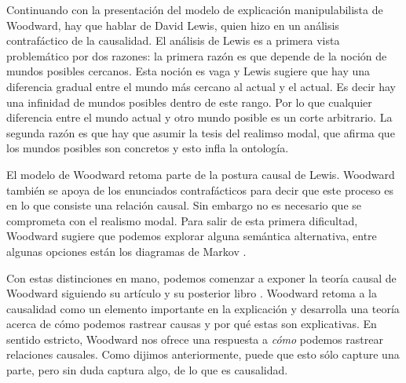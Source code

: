 
Continuando con la presentación del modelo de explicación manipulabilista de Woodward, hay que hablar de David Lewis, quien hizo en  \citeyear{Lewis1973a} un análisis contrafáctico de la causalidad. El análisis de Lewis es a primera vista problemático por dos razones: la primera razón es que depende de la noción de mundos posibles cercanos. Esta noción es vaga y Lewis sugiere que hay una diferencia gradual entre el mundo más cercano al actual y el actual. Es decir hay una infinidad de mundos posibles dentro de este rango. Por lo que cualquier diferencia entre el mundo actual y otro mundo posible es un corte arbitrario. La segunda razón es que hay que asumir la tesis del realimso modal, que afirma que los mundos posibles son concretos y esto infla la ontología.

El modelo de Woodward retoma parte de la postura causal de Lewis. Woodward también se apoya de los enunciados contrafácticos para decir que este proceso es en lo que consiste una relación causal. Sin embargo no es necesario que se comprometa con el realismo modal. Para salir de esta primera dificultad, Woodward sugiere que podemos explorar alguna semántica alternativa, entre algunas opciones están los diagramas de Markov \cite{pittphilsci18628}.

Con estas distinciones en mano, podemos comenzar a exponer la teoría causal de Woodward siguiendo su artículo \citeyear{Woodward2000} y su posterior libro \citeyear{Woodward2003}.  Woodward  retoma a la causalidad como un elemento importante en la explicación y desarrolla una teoría acerca de cómo podemos rastrear causas y por qué estas son explicativas. En sentido estricto, Woodward nos ofrece una respuesta a \textit{cómo} podemos rastrear relaciones causales. Como dijimos anteriormente, puede que esto sólo capture una parte, pero sin duda captura algo, de lo que es causalidad.

